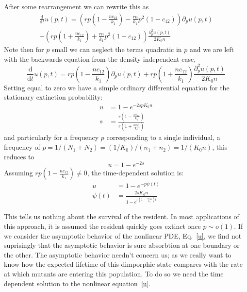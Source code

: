 \documentclass[letterpaper,10pt]{article}
\newcommand{\ud}{\mathrm{d}}
\begin{document}
After some rearrangement we can rewrite this as 
\begin{multline}
\frac{\ud}{\ud t} u(p,t) = \left( rp \left( 1-\frac{n c_{12}}{k_1} \right) - \frac{r n}{k_1} p^2 (1 - c_{12} )\right)  \partial_p u(p,t) \\
+ \left( rp \left(1+\frac{n c_{12}}{k_1}\right)  + \frac{r n }{k_1} p^2 (1 - c_{12} ) \right) \frac{\partial_p^2 u(p,t)}{2K_0 n}
\end{multline}
Note then for $p$ small we can neglect the terms quadratic in $p$ and we are left with the backwards equation from the density independent case, 
\begin{equation}
\frac{\ud}{\ud t} u(p,t) =  rp \left( 1-\frac{n c_{12}}{k_1} \right)   \partial_p u(p,t) + rp \left(1+\frac{n c_{12}}{k_1}\right)   \frac{\partial_p^2 u(p,t)}{2K_0 n}
\end{equation}
Setting equal to zero we have a simple ordinary differential equation for the stationary extinction probability:
\begin{align}
u &= 1 - e^{-2sp K_0 n} \\
s &= \frac{r\left( 1-\frac{n c_{12}}{k_1} \right) }{ r\left(1+\frac{n c_{12}}{k_1}\right)} 
\end{align}
and particularly for a frequency $p$ corresponding to a single individual, a frequency of $p=1/(N_1+N_2) =(1/K_0)/(n_1+n_2) = 1/(K_0 n)$, this reduces to
\begin{equation}
u = 1-e^{-2s}
\end{equation}
Assuming $ rp \left( 1-\frac{n c_{12}}{k_1} \right) \neq 0$, the time-dependent solution is:
\begin{align}
u &= 1-e^{-p \psi(t) } \\
\psi(t) &= \frac{2 s K_0 n}{1-e^{ r\left( 1-\frac{n c_{12}}{k_1} \right) t } }
\label{timedep}
\end{align}


This tells us nothing about the survival of the resident.  In most applications of this approach, it is assumed the resident quickly goes extinct once $p \sim o(1)$.  If we consider the asymptotic behavior of the nonlinear PDE, Eq.~\eqref{u}, we find not suprisingly that the asymptotic behavior is sure absorbtion at one boundary or the other. The asymptotic behavior needn't concern us; as we really want to know how the expected lifetime of this dimporphic state compares with the rate at which mutants are entering this population. To do so we need the time dependent solution to the nonlinear equation~\eqref{u}.    
\end{document}
